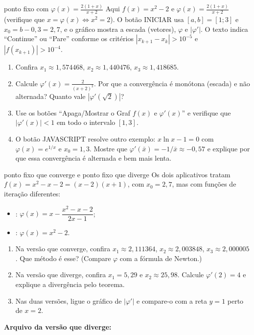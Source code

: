 \begin{atividade}{ponto fixo com $\varphi(x)=\frac{2(1+x)}{x+2}$}{\arqFixo}
Aqui $f(x)=x^2-2$ e $\varphi(x)=\frac{2(1+x)}{x+2}$ (verifique que $x=\varphi(x)\iff x^2=2$). O
botão INICIAR usa $[a,b]=[1;3]$ e $x_0=b-0{,}3=2{,}7$, e o gráfico mostra a escada (vetores),
$\varphi$ e $|\varphi'|$. O texto indica ``Continue'' ou ``Pare'' conforme os critérios
$|x_{k+1}-x_k|>10^{-5}$ e $|f(x_{k+1})|>10^{-4}$.
\begin{enumerate}[nosep]
  \item Confira $x_1\approx1{,}574468$, $x_2\approx1{,}440476$, $x_3\approx1{,}418685$.
  \item Calcule $\varphi'(x)=\frac{2}{(x+2)^2}$. Por que a convergência é monótona (escada) e não
        alternada? Quanto vale $|\varphi'(\sqrt2)|$?
  \item Use os botões ``Apaga/Mostrar o Graf $f(x)$ e $\varphi'(x)$'' e verifique que
        $|\varphi'(x)|<1$ em todo o intervalo $[1,3]$.
  \item O botão JAVASCRIPT resolve outro exemplo: $x\ln x-1=0$ com $\varphi(x)=e^{1/x}$ e $x_0=1{,}3$.
        Mostre que $\varphi'(\bar x)=-1/\bar x\approx-0{,}57$ e explique por que essa convergência é
        alternada e bem mais lenta.
\end{enumerate}
\end{atividade}

\begin{atividade}{ponto fixo que converge e ponto fixo que diverge}{\arqFixoC}
Os dois aplicativos tratam $f(x)=x^2-x-2=(x-2)(x+1)$, com $x_0=2{,}7$, mas com funções de
iteração diferentes:
\begin{itemize}[nosep]
  \item {}: $\varphi(x)=x-\dfrac{x^2-x-2}{2x-1}$;
  \item {}: $\varphi(x)=x^2-2$.
\end{itemize}
\begin{enumerate}[nosep]
  \item Na versão que converge, confira $x_1\approx2{,}111364$, $x_2\approx2{,}003848$,
        $x_3\approx2{,}000005$. Que método é esse? (Compare $\varphi$ com a fórmula de Newton.)
  \item Na versão que diverge, confira $x_1=5{,}29$ e $x_2\approx25{,}98$. Calcule $\varphi'(2)=4$
        e explique a divergência pelo teorema.
  \item Nas duas versões, ligue o gráfico de $|\varphi'|$ e compare-o com a reta $y=1$ perto de $x=2$.
\end{enumerate}
\small\textbf{Arquivo da versão que diverge:}\\ 
\end{atividade}

